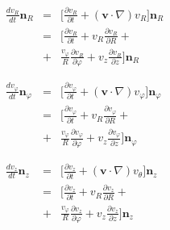 \begin{solution}
\begin{enumerate}
\begin{multicols}{2}
\begin{eqnarray}
\frac{d v_R}{dt}\mathbf{n}_R & = &
   \Big[
       \frac{\partial v_R}{\partial t} + (\mathbf{v}\cdot\nabla)v_R
   \Big]\mathbf{n}_R\nonumber\\
   & = &
   \Big[
       \frac{\partial v_R}{\partial t} +
       v_R\frac{\partial v_R}{\partial R} +\nonumber\\
   & + & \frac{v_\varphi}{R}\frac{\partial v_R}{\partial\varphi}+v_z\frac{\partial v_R}{\partial z}
   \Big]\mathbf{n}_R
      \nonumber\\
   \nonumber\\
   \nonumber\\
      \frac{d v_\varphi}{dt}\mathbf{n}_\varphi & = &
   \Big[
       \frac{\partial v_\varphi}{\partial t} + (\mathbf{v}\cdot\nabla)v_\varphi
   \Big]\mathbf{n}_\varphi\nonumber\\
   & = &
   \Big[
       \frac{\partial v_\varphi}{\partial t} +
       v_R\frac{\partial v_\varphi}{\partial R} +\nonumber\\
   & + & \frac{v_\varphi}{R}\frac{\partial v_\varphi}{\partial\varphi}+v_z\frac{\partial v_\varphi}{\partial z}
   \Big]\mathbf{n}_\varphi
   \nonumber\\
   \nonumber\\
   \nonumber\\
   \frac{d v_z}{dt}\mathbf{n}_z& = &
   \Big[
       \frac{\partial v_z}{\partial t} + (\mathbf{v}\cdot\nabla)v_\theta
   \Big]\mathbf{n}_z\nonumber\\
   & = &
   \Big[
       \frac{\partial v_z}{\partial t} +
       v_R\frac{\partial v_z}{\partial R} +\nonumber\\
   & + & \frac{v_\varphi}{R}\frac{\partial v_z}{\partial\varphi}+v_z\frac{\partial v_z}{\partial z}
   \Big]\mathbf{n}_z
   \nonumber\\
   \nonumber
\end{eqnarray}
\end{multicols}


\end{enumerate}
\end{solution}
